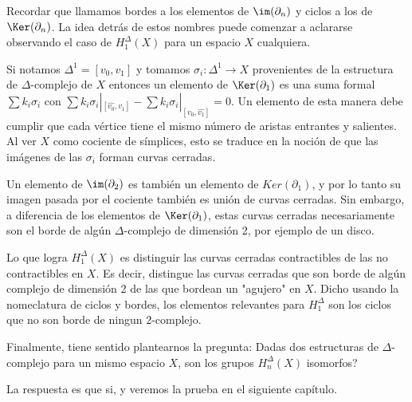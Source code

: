 \begin{obs}
    Recordar que llamamos bordes a los elementos de $\im(\partial_n)$ y ciclos a los de $\Ker(\partial_n)$. La idea detrás de estos nombres puede comenzar a aclararse observando el caso de $H^\Delta_1(X)$ para un espacio $X$ cualquiera.\br
    
    Si notamos $\Delta^1=[v_0,v_1]$ y tomamos $\sigma_i:\Delta^1\to X$ provenientes de la estructura de $\Delta$-complejo de $X$ entonces un elemento de $\Ker(\partial_1)$ es una suma formal $\sum k_i\sigma_i$ con $\sum k_i\sigma_i|_{[\hat{v_0},v_1]} - \sum k_i\sigma_i|_{[v_0,\hat{v_1}]}=0$. Un elemento de esta manera debe cumplir que cada vértice tiene el mismo número de aristas entrantes y salientes. Al ver $X$ como cociente de símplices, esto se traduce en la noción de que las imágenes de las $\sigma_i$ forman curvas cerradas.\br

    Un elemento de $\im(\partial_2)$ es también un elemento de $Ker(\partial_1)$, y por lo tanto su imagen pasada por el cociente también es unión de curvas cerradas. Sin embargo, a diferencia de los elementos de $\Ker(\partial_1)$, estas curvas cerradas necesariamente son el borde de algún $\Delta$-complejo de dimensión 2, por ejemplo de un disco.\br

    Lo que logra $H_1^\Delta(X)$ es distinguir las curvas cerradas contractibles de las no contractibles en $X$. Es decir, distingue las curvas cerradas que son borde de algún complejo de dimensión 2 de las que bordean un "agujero" en $X$. Dicho usando la nomeclatura de ciclos y bordes, los elementos relevantes para $H_1^\Delta$ son los ciclos que no son borde de ningun $2$-complejo.\br
\end{obs}

Finalmente, tiene sentido plantearnos la pregunta: Dadas dos estructuras de $\Delta$-complejo para un mismo espacio $X$, son los grupos $H^\Delta_n(X)$ isomorfos? \br

La respuesta es que si, y veremos la prueba en el siguiente capítulo.

